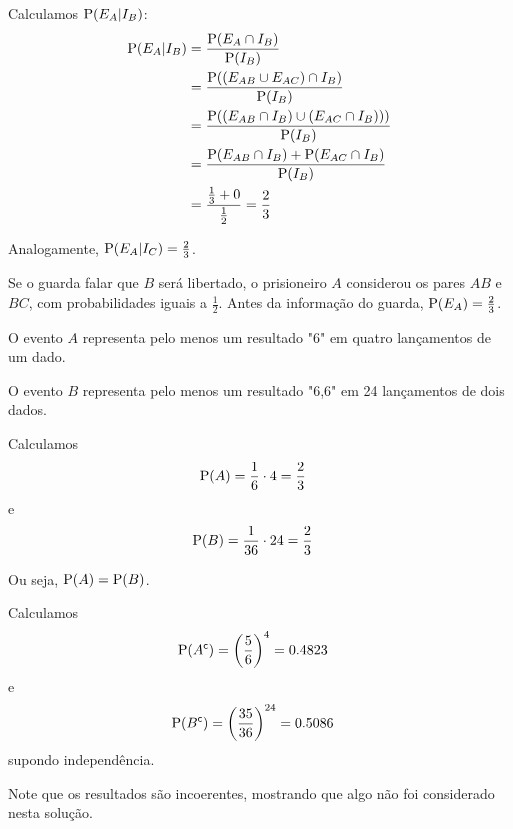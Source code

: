 \begin{example}
    Calculamos $\operatorname{P}(E_A | I_B)$:
    \begin{align*}
        \operatorname{P}(E_A | I_B) &= \frac{\operatorname{P}(E_A \cap I_B)}{\operatorname{P}(I_B)} \\
        &= \frac{\operatorname{P}((E_{AB} \cup E_{AC}) \cap I_B)}{\operatorname{P}(I_B)} \\
        &= \frac{\operatorname{P}((E_{AB} \cap I_B) \cup (E_{AC} \cap I_B)))}
            {\operatorname{P}(I_B)} \\
        &= \frac{\operatorname{P}(E_{AB} \cap I_B) + \operatorname{P}(E_{AC} \cap I_B)}
            {\operatorname{P}(I_B)} \\
        &= \frac{{\textstyle\frac{1}{3}} + 0}
            {{\textstyle\frac{1}{2}}} = \frac{2}{3}
    \end{align*}

    Analogamente, $\operatorname{P}(E_A | I_C) = \frac{2}{3}$.

    Se o guarda falar que $B$ será libertado, o prisioneiro $A$
    considerou os pares $AB$ e $BC$, com probabilidades iguais a $\frac{1}{2}$.
    Antes da informação do guarda, $\operatorname{P}(E_A) = \frac{2}{3}$.
\end{example}

\begin{example}
    O evento $A$ representa pelo menos um resultado "6"
    em quatro lançamentos de um dado.

    O evento $B$ representa pelo menos um resultado "6,6"
    em 24 lançamentos de dois dados.

    \bigskip
    Calculamos
    \begin{align*}
        \operatorname{P}(A) &= \frac{1}{6} \cdot 4 = \frac{2}{3}
    \end{align*}
    e
    \begin{align*}
        \operatorname{P}(B) &= \frac{1}{36} \cdot 24 = \frac{2}{3}
    \end{align*}
    
    Ou seja, $\operatorname{P}(A) = \operatorname{P}(B)$.

    \bigskip
    Calculamos
    \begin{align*}
        \operatorname{P}({A}^{\mathsf{c}}) &= \left(\frac{5}{6}\right)^4 
        = 0.4823
    \end{align*}
    e
    \begin{align*}
        \operatorname{P}({B}^{\mathsf{c}}) &= \left(\frac{35}{36}\right)^{24}
        = 0.5086
    \end{align*}
    supondo independência.

    \begin{obs}
        Note que os resultados são incoerentes, mostrando que algo não
        foi considerado nesta solução.
    \end{obs}
\end{example}